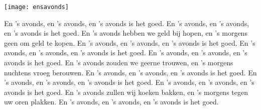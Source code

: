 \begin{intersong}
    \texttt{[image: ensavonds]}
\end{intersong}
\beginverse*
En 's avonds, en 's avonds, en 's avonds is het goed.
En 's avonds, en 's avonds, en 's avonds is het goed.
En 's avonds hebben we geld bij hopen,
en 's morgens geen om geld te kopen.
En 's avonds, en 's avonds, en 's avonds is het goed.
\endverse
\beginverse*
En 's avonds, en 's avonds, en 's avonds is het goed.
En 's avonds, en 's avonds, en 's avonds is het goed.
En 's avonds zouden we geerne trouwen,
en 's morgens nuchtens vroeg berouwen.
En 's avonds, en 's avonds, en 's avonds is het goed.
\endverse
\beginverse*
En 's avonds, en 's avonds, en 's avonds is het goed.
En 's avonds, en 's avonds, en 's avonds is het goed.
En 's avonds zullen wij koeken bakken,
en 's morgens tegen uw oren plakken.
En 's avonds, en 's avonds, en 's avonds is het goed.
\endverse
\endsong